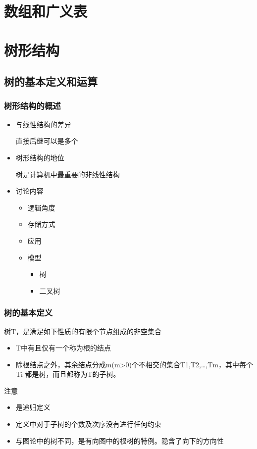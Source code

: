 \documentclass[AutoFakeBold]{LZUThesis2007}
\begin{document}
\chapter{数组和广义表}

\chapter{树形结构}
	\section{树的基本定义和运算}
		\subsection{树形结构的概述}
			\begin{itemize}
				\item 与线性结构的差异
				
				直接后继可以是多个
				\item 树形结构的地位

				树是计算机中最重要的非线性结构
				\item 讨论内容
					\begin{itemize}
						\item 逻辑角度
						\item 存储方式
						\item 应用
						\item 模型
						\begin{itemize}
							\item 树
							\item 二叉树
						\end{itemize}
					
					\end{itemize}

			\end{itemize}

		\subsection{树的基本定义}
		树T，是满足如下性质的有限个节点组成的非空集合
			\begin{itemize}
				\item T中有且仅有一个称为根的结点
				\item 除根结点之外，其余结点分成m(m>0)个不相交的集合T1,T2,…,Tm，其中每个Ti 都是树，而且都称为T的子树。
			
			\end{itemize}
		注意
\begin{itemize}
	\item 是递归定义
	\item 定义中对于子树的个数及次序没有进行任何约束
	\item 与图论中的树不同，是有向图中的根树的特例。隐含了向下的方向性

\end{itemize}
\end{document}
